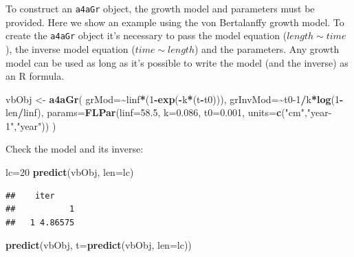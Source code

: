 \documentclass[
]{book}
\newenvironment{Shaded}{\begin{snugshade}}{\end{snugshade}}
\newcommand{\AttributeTok}[1]{\textcolor[rgb]{0.13,0.29,0.53}{#1}}
\newcommand{\DecValTok}[1]{\textcolor[rgb]{0.00,0.00,0.81}{#1}}
\newcommand{\FloatTok}[1]{\textcolor[rgb]{0.00,0.00,0.81}{#1}}
\newcommand{\FunctionTok}[1]{\textcolor[rgb]{0.13,0.29,0.53}{\textbf{#1}}}
\newcommand{\NormalTok}[1]{#1}
\newcommand{\OtherTok}[1]{\textcolor[rgb]{0.56,0.35,0.01}{#1}}
\newcommand{\SpecialCharTok}[1]{\textcolor[rgb]{0.81,0.36,0.00}{\textbf{#1}}}
\newcommand{\StringTok}[1]{\textcolor[rgb]{0.31,0.60,0.02}{#1}}
\begin{document}
To construct an \texttt{a4aGr} object, the growth model and parameters must be provided. Here we show an example using the von Bertalanffy growth model. To create the \texttt{a4aGr} object it's necessary to pass the model equation (\(length \sim time\)), the inverse model equation (\(time \sim length\)) and the parameters. Any growth model can be used as long as it's possible to write the model (and the inverse) as an R formula.

\begin{Shaded}
\begin{Highlighting}[]
\NormalTok{vbObj }\OtherTok{\textless{}{-}} \FunctionTok{a4aGr}\NormalTok{(}
    \AttributeTok{grMod=}\SpecialCharTok{\textasciitilde{}}\NormalTok{linf}\SpecialCharTok{*}\NormalTok{(}\DecValTok{1}\SpecialCharTok{{-}}\FunctionTok{exp}\NormalTok{(}\SpecialCharTok{{-}}\NormalTok{k}\SpecialCharTok{*}\NormalTok{(t}\SpecialCharTok{{-}}\NormalTok{t0))),      }
    \AttributeTok{grInvMod=}\SpecialCharTok{\textasciitilde{}}\NormalTok{t0}\DecValTok{{-}1}\SpecialCharTok{/}\NormalTok{k}\SpecialCharTok{*}\FunctionTok{log}\NormalTok{(}\DecValTok{1}\SpecialCharTok{{-}}\NormalTok{len}\SpecialCharTok{/}\NormalTok{linf),      }
    \AttributeTok{params=}\FunctionTok{FLPar}\NormalTok{(}\AttributeTok{linf=}\FloatTok{58.5}\NormalTok{, }\AttributeTok{k=}\FloatTok{0.086}\NormalTok{, }\AttributeTok{t0=}\FloatTok{0.001}\NormalTok{, }\AttributeTok{units=}\FunctionTok{c}\NormalTok{(}\StringTok{"cm"}\NormalTok{,}\StringTok{"year{-}1"}\NormalTok{,}\StringTok{"year"}\NormalTok{))     }
\NormalTok{)}
\end{Highlighting}
\end{Shaded}

Check the model and its inverse:

\begin{Shaded}
\begin{Highlighting}[]
\NormalTok{lc}\OtherTok{=}\DecValTok{20}
\FunctionTok{predict}\NormalTok{(vbObj, }\AttributeTok{len=}\NormalTok{lc)}
\end{Highlighting}
\end{Shaded}

\begin{verbatim}
##    iter
##           1
##   1 4.86575
\end{verbatim}

\begin{Shaded}
\begin{Highlighting}[]
\FunctionTok{predict}\NormalTok{(vbObj, }\AttributeTok{t=}\FunctionTok{predict}\NormalTok{(vbObj, }\AttributeTok{len=}\NormalTok{lc))}
\end{Highlighting}
\end{Shaded}
\end{document}
